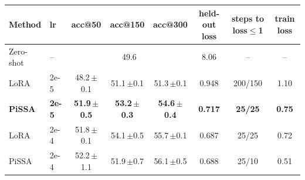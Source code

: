 \begin{tabular}{llcccccc}
\toprule
Method & lr & acc@50 & acc@150 & acc@300 & held-out loss & steps to loss$\le$1 & train loss \\
\midrule
Zero-shot & -- & \multicolumn{3}{c}{49.6} & 8.06 & -- & -- \\
LoRA & 2e-5 & 48.2\,$\pm$0.1 & 51.1\,$\pm$0.1 & 51.3\,$\pm$0.1 & 0.948 & 200/150 & 1.10 \\
\textbf{PiSSA} & \textbf{2e-5} & \textbf{51.9\,$\pm$0.5} & \textbf{53.2\,$\pm$0.3} & \textbf{54.6\,$\pm$0.4} & \textbf{0.717} & \textbf{25/25} & \textbf{0.75} \\
LoRA & 2e-4 & 51.8\,$\pm$0.1 & 54.1\,$\pm$0.5 & 55.7\,$\pm$0.1 & 0.687 & 25/25 & 0.72 \\
PiSSA & 2e-4 & 52.2\,$\pm$1.1 & 51.9\,$\pm$0.7 & 56.1\,$\pm$0.5 & 0.688 & 25/10 & 0.51 \\
\bottomrule
\end{tabular}
